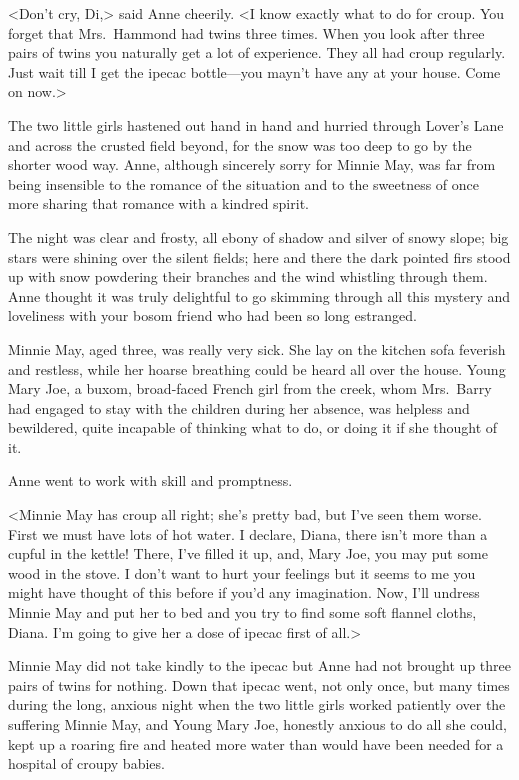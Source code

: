 <Don't cry, Di,> said Anne cheerily. <I know exactly what to do for croup. You forget that Mrs.~Hammond had twins three times. When you look after three pairs of twins you naturally get a lot of experience. They all had croup regularly. Just wait till I get the ipecac bottle—you mayn't have any at your house. Come on now.>

The two little girls hastened out hand in hand and hurried through Lover's Lane and across the crusted field beyond, for the snow was too deep to go by the shorter wood way. Anne, although sincerely sorry for Minnie May, was far from being insensible to the romance of the situation and to the sweetness of once more sharing that romance with a kindred spirit.

The night was clear and frosty, all ebony of shadow and silver of snowy slope; big stars were shining over the silent fields; here and there the dark pointed firs stood up with snow powdering their branches and the wind whistling through them. Anne thought it was truly delightful to go skimming through all this mystery and loveliness with your bosom friend who had been so long estranged.

Minnie May, aged three, was really very sick. She lay on the kitchen sofa feverish and restless, while her hoarse breathing could be heard all over the house. Young Mary Joe, a buxom, broad-faced French girl from the creek, whom Mrs.~Barry had engaged to stay with the children during her absence, was helpless and bewildered, quite incapable of thinking what to do, or doing it if she thought of it.

Anne went to work with skill and promptness.

<Minnie May has croup all right; she's pretty bad, but I've seen them worse. First we must have lots of hot water. I declare, Diana, there isn't more than a cupful in the kettle! There, I've filled it up, and, Mary Joe, you may put some wood in the stove. I don't want to hurt your feelings but it seems to me you might have thought of this before if you'd any imagination. Now, I'll undress Minnie May and put her to bed and you try to find some soft flannel cloths, Diana. I'm going to give her a dose of ipecac first of all.>

Minnie May did not take kindly to the ipecac but Anne had not brought up three pairs of twins for nothing. Down that ipecac went, not only once, but many times during the long, anxious night when the two little girls worked patiently over the suffering Minnie May, and Young Mary Joe, honestly anxious to do all she could, kept up a roaring fire and heated more water than would have been needed for a hospital of croupy babies.

